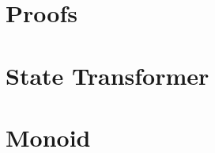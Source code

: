 \documentclass[10pt,a4paper]{article}
\begin{document}
\maketitle
\vfill

\clearpage
\tableofcontents
\clearpage





















\appendix
\pagebreak
\section{Proofs}


\pagebreak
\section{State Transformer}


\pagebreak
\section{Monoid}


\clearpage

\end{document}
